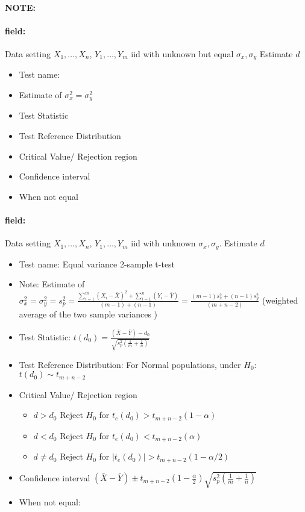 \documentclass[12pt]{article}
\newenvironment{note}{\paragraph{NOTE:}}{}
\newenvironment{field}{\paragraph{field:}}{}
\begin{document}
\begin{note}
  \begin{field}
    Data setting $X_1, \ldots , X_n$, $Y_1, \ldots, Y_m$ iid with unknown but equal  $\sigma_x, \sigma_y$ Estimate $d$
    \begin{itemize}
      \item Test name:
      \item Estimate of $\sigma_x^2 = \sigma_y^2$
      \item Test Statistic
      \item Test Reference Distribution
      \item Critical Value/ Rejection region
      \item Confidence interval
      \item When not equal
    \end{itemize}
  \end{field}
  \begin{field}
    Data setting $X_1, \ldots , X_n$, $Y_1, \ldots, Y_m$ iid with unknown $\sigma_x, \sigma_y$. Estimate $d$
    \begin{itemize}
      \item Test name: Equal variance 2-sample t-test
      \item Note: Estimate of $\sigma_x^2 = \sigma_y^2 = s_p^2 = \frac{\sum_{i=1}^m (X_i - \bar{X})^2 + \sum_{i=1}^n (Y_i - \bar{Y})}{(m-1) + (n-1)} = \frac{(m-1)s_x^2 + (n-1)s_y^2}{(m+n-2)}$ (weighted average of the two sample variances )
      \item Test Statistic: $t(d_0) = \frac{(\bar{X} - \bar{Y}) - d_0}{\sqrt{s_p^2(\frac{1}{m} + \frac{1}{n})}}$
      \item Test Reference Distribution: For Normal populations, under $H_0$: $t(d_0) \sim t_{m+n-2}$
      \item Critical Value/ Rejection region
      \begin{itemize}
        \item $d > d_0$ Reject $H_0$ for $t_e(d_0) > t_{m+n-2}(1 - \alpha)$
        \item $d < d_0$ Reject $H_0$ for $t_e(d_0) < t_{m+n-2}(\alpha)$
        \item $d \neq d_0$ Reject $H_0$ for $|t_e(d_0)| > t_{m+n-2}(1 - \alpha/2)$
      \end{itemize}
      \item Confidence interval $ (\bar{X} - \bar{Y}) \pm t_{m+n-2}(1 - \frac{\alpha}{2})\sqrt{s_p^2(\frac{1}{m} + \frac{1}{n})}$
      \item When not equal:

\end{itemize}
\end{field}
\end{note}
\end{document}
